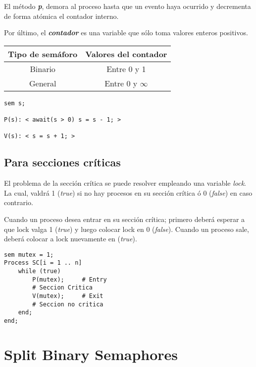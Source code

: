 \documentclass[a4paper, 10pt]{report}
\begin{document}
El método \textbf{\emph{p}}, demora al proceso hasta que un evento haya ocurrido y decrementa de forma atómica el contador interno.

Por último, el \textbf{\emph{contador}} es una variable que sólo toma valores enteros positivos.



\begin{multicols}{2}

	{\renewcommand{\arraystretch}{2}%
	\centering
	\begin{tabular}{cc}
		\textbf{Tipo de semáforo} & \textbf{Valores del contador}\\
		\hline 
		Binario & Entre 0 y 1\\ 
		General & Entre 0 y $\infty$\\ 
	\end{tabular}}

\begin{lstlisting}
sem s;

P(s): < await(s > 0) s = s - 1; >

V(s): < s = s + 1; >
\end{lstlisting}

\columnbreak


	
\end{multicols}




\subsection{Para secciones críticas}

El problema de la sección crítica se puede resolver empleando una variable \emph{lock}. La cual, valdrá 1 (\emph{true}) si no hay procesos en su sección crítica ó 0 (\emph{false}) en caso contrario.

Cuando un proceso desea entrar en su sección crítica; primero deberá esperar a que lock valga 1 (\emph{true}) y luego colocar lock en 0 (\emph{false}). Cuando un proceso sale, deberá colocar a lock nuevamente en (\emph{true}).

\begin{lstlisting}
sem mutex = 1;
Process SC[i = 1 .. n]
	while (true)
		P(mutex);     # Entry
		# Seccion Critica
		V(mutex);     # Exit
		# Seccion no critica
	end;
end;
\end{lstlisting}

\section{Split Binary Semaphores}
\end{document}
